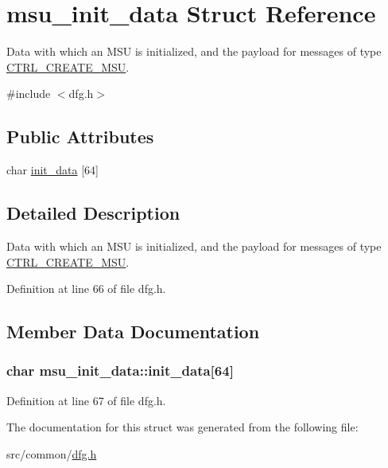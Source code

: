 \hypertarget{structmsu__init__data}{\section{msu\-\_\-init\-\_\-data Struct Reference}
\label{structmsu__init__data}
}


Data with which an M\-S\-U is initialized, and the payload for messages of type \hyperlink{ctrl__runtime__messages_8h_aff250b7918a6975b13277c84bc6ec5b9a63b47c3674f449f7bb6842ff88c04d5e}{C\-T\-R\-L\-\_\-\-C\-R\-E\-A\-T\-E\-\_\-\-M\-S\-U}.  




{\ttfamily \#include $<$dfg.\-h$>$}

\subsection*{Public Attributes}
\begin{DoxyCompactItemize}
\item 
char \hyperlink{structmsu__init__data_a9855c57d43bdbbb52bd766ae8dfd42f3}{init\-\_\-data} \mbox{[}64\mbox{]}
\end{DoxyCompactItemize}


\subsection{Detailed Description}
Data with which an M\-S\-U is initialized, and the payload for messages of type \hyperlink{ctrl__runtime__messages_8h_aff250b7918a6975b13277c84bc6ec5b9a63b47c3674f449f7bb6842ff88c04d5e}{C\-T\-R\-L\-\_\-\-C\-R\-E\-A\-T\-E\-\_\-\-M\-S\-U}. 

Definition at line 66 of file dfg.\-h.



\subsection{Member Data Documentation}
\hypertarget{structmsu__init__data_a9855c57d43bdbbb52bd766ae8dfd42f3}{
\subsubsection[{init\-\_\-data}]{\setlength{\rightskip}{0pt plus 5cm}char msu\-\_\-init\-\_\-data\-::init\-\_\-data\mbox{[}64\mbox{]}}}\label{structmsu__init__data_a9855c57d43bdbbb52bd766ae8dfd42f3}


Definition at line 67 of file dfg.\-h.



The documentation for this struct was generated from the following file\-:\begin{DoxyCompactItemize}
\item 
src/common/\hyperlink{dfg_8h}{dfg.\-h}\end{DoxyCompactItemize}
